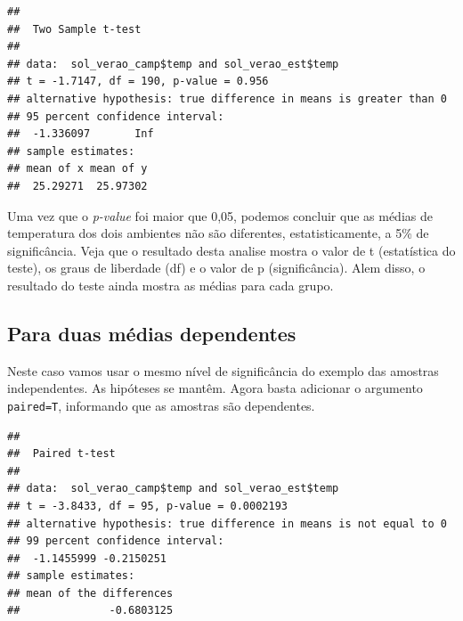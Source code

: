 \documentclass[
]{book}
\newenvironment{Shaded}{\begin{snugshade}}{\end{snugshade}}
\newcommand{\CommentTok}[1]{\textcolor[rgb]{0.56,0.35,0.01}{\textit{#1}}}
\newcommand{\DataTypeTok}[1]{\textcolor[rgb]{0.13,0.29,0.53}{#1}}
\newcommand{\FloatTok}[1]{\textcolor[rgb]{0.00,0.00,0.81}{#1}}
\newcommand{\KeywordTok}[1]{\textcolor[rgb]{0.13,0.29,0.53}{\textbf{#1}}}
\newcommand{\NormalTok}[1]{#1}
\newcommand{\OperatorTok}[1]{\textcolor[rgb]{0.81,0.36,0.00}{\textbf{#1}}}
\begin{document}
\begin{verbatim}
## 
##  Two Sample t-test
## 
## data:  sol_verao_camp$temp and sol_verao_est$temp
## t = -1.7147, df = 190, p-value = 0.956
## alternative hypothesis: true difference in means is greater than 0
## 95 percent confidence interval:
##  -1.336097       Inf
## sample estimates:
## mean of x mean of y 
##  25.29271  25.97302
\end{verbatim}

Uma vez que o \emph{p-value} foi maior que 0,05, podemos concluir que as médias de temperatura dos dois ambientes não são diferentes, estatisticamente, a 5\% de significância.
Veja que o resultado desta analise mostra o valor de t (estatística do teste), os graus de liberdade (df) e o valor de p (significância). Alem disso, o resultado do teste ainda mostra as médias para cada grupo.

\hypertarget{para-duas-muxe9dias-dependentes}{%
\subsection{Para duas médias dependentes}\label{para-duas-muxe9dias-dependentes}}

Neste caso vamos usar o mesmo nível de significância do exemplo das amostras independentes.
As hipóteses se mantêm. Agora basta adicionar o argumento \texttt{paired=T}, informando que as amostras são dependentes.

\begin{Shaded}
\end{Shaded}

\begin{verbatim}
## 
##  Paired t-test
## 
## data:  sol_verao_camp$temp and sol_verao_est$temp
## t = -3.8433, df = 95, p-value = 0.0002193
## alternative hypothesis: true difference in means is not equal to 0
## 99 percent confidence interval:
##  -1.1455999 -0.2150251
## sample estimates:
## mean of the differences 
##              -0.6803125
\end{verbatim}
\end{document}
